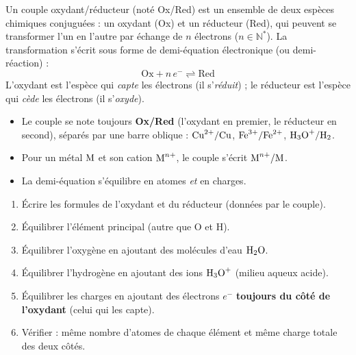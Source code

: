 \documentclass[11pt]{article}
\newcommand{\cle}[1]{{\popxbold\color{popdark}#1}}
\begin{document}
\begin{definition}
Un \cle{couple oxydant/réducteur} (noté \cle{Ox/Red}) est un ensemble de deux espèces chimiques conjuguées : un \cle{oxydant} (\cle{Ox}) et un \cle{réducteur} (\cle{Red}), qui peuvent se transformer l'un en l'autre par échange de $n$ électrons ($n \in \mathbb{N}^*$).
La transformation s'écrit sous forme de \cle{demi-équation électronique} (ou demi-réaction) :
\[ \mathrm{Ox} + n\,e^- \rightleftharpoons \mathrm{Red} \]
L'oxydant est l'espèce qui \emph{capte} les électrons (il s'\emph{réduit}) ; le réducteur est l'espèce qui \emph{cède} les électrons (il s'\emph{oxyde}).
\end{definition}

\begin{propriete}
\begin{itemize}
  \item Le couple se note toujours \textbf{Ox/Red} (l'oxydant en premier, le réducteur en second), séparés par une barre oblique : $\ce{Cu^2+}/\ce{Cu}$, $\ce{Fe^3+}/\ce{Fe^2+}$, $\ce{H3O+}/\ce{H2}$.
  \item Pour un métal $\ce{M}$ et son cation $\ce{M^{n+}}$, le couple s'écrit $\ce{M^{n+}}/\ce{M}$.
  \item La demi-équation s'équilibre en atomes \emph{et} en charges.
\end{itemize}
\end{propriete}

\begin{methode}
\begin{enumerate}
  \item Écrire les formules de l'oxydant et du réducteur (données par le couple).
  \item Équilibrer l'élément principal (autre que O et H).
  \item Équilibrer l'oxygène en ajoutant des molécules d'eau $\ce{H2O}$.
  \item Équilibrer l'hydrogène en ajoutant des ions $\ce{H3O+}$ (milieu aqueux acide).
  \item Équilibrer les charges en ajoutant des électrons $e^-$ \textbf{toujours du côté de l'oxydant} (celui qui les capte).
  \item Vérifier : même nombre d'atomes de chaque élément et même charge totale des deux côtés.
\end{enumerate}
\end{methode}
\end{document}
